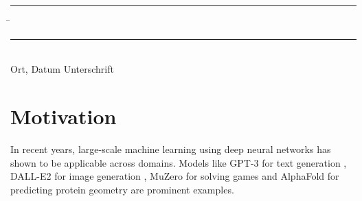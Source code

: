 \documentclass[12pt]{article}
\theoremstyle{definition}
\numberwithin{equation}{section}
\begin{document}
\vspace*{3em}

\begin{tabbing}
  \rule{.4\textwidth}{1pt} \hspace*{.2\textwidth}
  \= \rule{.4\textwidth}{1pt} \\
  Ort, Datum \> Unterschrift
\end{tabbing}

\newpage
\mbox{}
\newpage
\tableofcontents
\newpage
\listoffigures
\newpage
\printnomenclature
\newpage
\section{Motivation}
\label{sec:Motivation}
In recent years, large-scale machine learning using deep neural networks has shown to be applicable across domains. Models like GPT-3 for text generation \autocite{brownLanguageModelsAre2020}, DALL-E2 for image generation \autocite{rameshHierarchicalTextConditionalImage2022}, MuZero for solving games \autocite{schrittwieserMasteringAtariGo2020} and AlphaFold for predicting protein geometry \autocite{jumperHighlyAccurateProtein2021} are prominent examples.
\end{document}
